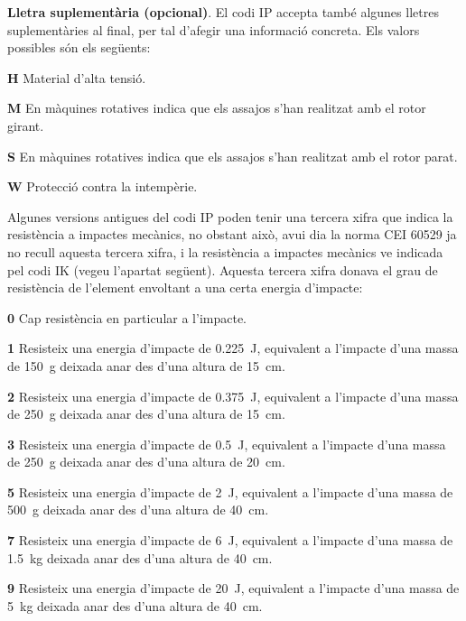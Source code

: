\textbf{Lletra suplementària (opcional)}. El codi IP accepta també algunes
lletres suplementàries al final, per tal d'afegir una informació concreta. Els valors
possibles són els següents:
\begin{list}{}
   {\setlength{\labelwidth}{10mm} \setlength{\leftmargin}{10mm} \setlength{\labelsep}{2mm}}
   \item[\textbf{H}] Material d'alta tensió.
   \item[\textbf{M}] En màquines rotatives indica que els assajos s'han realitzat amb el
    rotor girant.
   \item[\textbf{S}] En màquines rotatives indica que els assajos s'han realitzat amb el
    rotor parat.
   \item[\textbf{W}] Protecció contra la intempèrie.
\end{list}


Algunes versions antigues del codi IP poden tenir una tercera xifra que indica la resistència a impactes mecànics, no obstant això, avui  dia la norma CEI 60529 ja no recull aquesta tercera xifra, i la resistència a impactes mecànics ve indicada pel codi IK (vegeu l'apartat següent). Aquesta tercera xifra donava el grau de resistència de l'element envoltant a una certa energia d'impacte:
\begin{list}{}
   {\setlength{\labelwidth}{10mm} \setlength{\leftmargin}{10mm} \setlength{\labelsep}{2mm}}
   \item[\textbf{0}] Cap resistència en particular a l'impacte.
   \item[\textbf{1}] Resisteix una energia d'impacte de \qty{0,225}{J}, equivalent a l'impacte d'una massa de \qty{150}{g} deixada anar des d'una altura de \qty{15}{cm}.
   \item[\textbf{2}] Resisteix una energia d'impacte de \qty{0,375}{J}, equivalent a l'impacte d'una massa de \qty{250}{g} deixada anar des d'una altura de \qty{15}{cm}.
   \item[\textbf{3}] Resisteix una energia d'impacte de \qty{0,5}{J}, equivalent a l'impacte d'una massa de \qty{250}{g} deixada anar des d'una altura de \qty{20}{cm}.
   \item[\textbf{5}] Resisteix una energia d'impacte de \qty{2}{J}, equivalent a l'impacte d'una massa de \qty{500}{g} deixada anar des d'una altura de \qty{40}{cm}.
   \item[\textbf{7}] Resisteix una energia d'impacte de \qty{6}{J}, equivalent a l'impacte d'una massa de \qty{1,5}{kg} deixada anar des d'una altura de \qty{40}{cm}.
   \item[\textbf{9}]Resisteix una energia d'impacte de \qty{20}{J}, equivalent a l'impacte d'una massa de \qty{5}{kg} deixada anar des d'una altura de \qty{40}{cm}.
\end{list}

